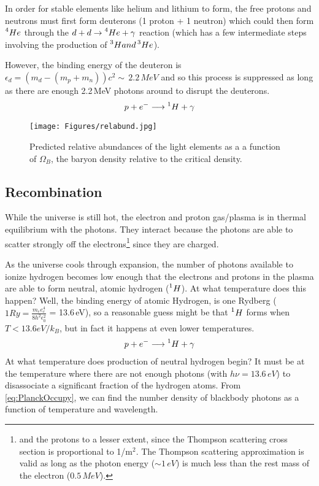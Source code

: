 In order for stable elements like helium and lithium to form, the free
protons and neutrons must first form deuterons (1 proton + 1 neutron) which could then form $\prescript{4}{}He$ through the 
$d + d \rightarrow \prescript{4}{}He + \gamma$ reaction (which has a few intermediate steps involving the production of $\prescript{3}{}H and \prescript{3}{}He$). 

However, the binding energy of the deuteron is $\epsilon_{d} = (m_d - (m_p + m_n))c^2 \sim\,2.2\,MeV$
and so this process is suppressed as long as there are enough 2.2\,MeV photons around to disrupt the deuterons.
\begin{align}
p + e^- \longrightarrow \prescript{1}{}H + \gamma
\end{align}

\begin{figure}[h]
\centering
\texttt{[image: Figures/relabund.jpg]}
\caption{Predicted relative abundances of the light elements as a
a function of $\Omega_B$, the baryon density relative to the 
critical density.}
\label{fig:Neutrons}
\end{figure}


\subsection{Recombination}
While the universe is still hot, the electron and proton gas/plasma is in thermal equilibrium with the photons. They interact because the photons are able to scatter strongly off the electrons\footnote{and the protons to a lesser extent, since the Thompson scattering cross section is proportional to 1/m$^2$. The Thompson scattering approximation is valid as long as the photon 
energy ($\sim 1\,eV$) is much less than the rest mass of the 
electron ($0.5\,MeV$).} since they are charged.

As the universe cools through expansion, the number of photons available to ionize 
hydrogen becomes low enough that the electrons and protons in the plasma are able to 
form neutral, atomic hydrogen ($\prescript{1}{}H$). At what temperature does this happen? Well, the
binding energy of atomic Hydrogen, is one Rydberg 
($1 Ry = \frac{m_e e_c^4}{8 h^2 \epsilon_0^2}$ = 13.6\,eV), so a reasonable guess might be that
$\prescript{1}{}H$ forms when $T < 13.6 eV / k_B$, but in fact it happens at even lower temperatures. 
\begin{align}
p + e^- \longrightarrow \prescript{1}{}H + \gamma
\end{align}
At what temperature does production of neutral hydrogen begin? It must be at the temperature where there are not enough photons (with $h \nu = 13.6\,eV$) to disassociate a significant fraction of the hydrogen atoms. 
From \cref{eq:PlanckOccupy}, we can find the number density of 
blackbody photons as a function of temperature and wavelength.


